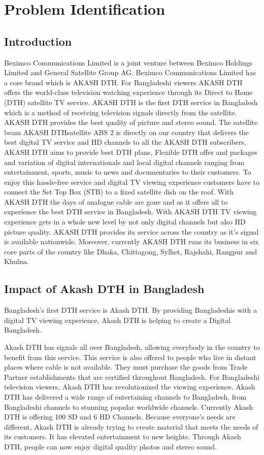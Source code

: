 \chapter{Problem Identification}
\begin{spacing}{1.0}
\setlength{\parskip}{0.3in}
\graphicspath{{./Chapter1/}}


\section{Introduction}
Beximco  Communications Limited is a joint venture between Beximco Holdings Limited and General Satellite Group AG. Beximco Communications Limited has a core brand which is AKASH DTH. For Bangladeshi viewers AKASH DTH offers the world-class television watching experience through its Direct to Home (DTH) satellite TV service. AKASH DTH is the first DTH service in Bangladesh which is a method of receiving television signals directly from the satellite. AKASH DTH provides the best quality of picture and stereo sound. The satellite beam AKASH DTHsatellite ABS 2 is directly on our country that delivers the best digital TV service and HD channels to all the AKASH DTH subscribers. AKASH DTH aims to provide best DTH plans, Flexible DTH offer and packages and variation of digital internationals and local digital channels ranging from entertainment, sports, music to news and documentaries to their customers. To enjoy this hassle-free service and digital TV viewing experience customers have to connect the Set Top Box (STB) to a fixed satellite dish on the roof. With AKASH DTH the days of analogue cable are gone and as it offers all to experience the best DTH service in Bangladesh. With AKASH DTH TV viewing experience gets in a whole new level by not only digital channels but also HD picture quality. AKASH DTH provides its service across the country as it’s signal is available nationwide. Moreover, currently AKASH DTH runs its business in six core parts of the country like Dhaka, Chittagong, Sylhet, Rajshahi, Rangpur and Khulna.

\section{Impact of Akash DTH in Bangladesh}
Bangladesh's first DTH service is Akash DTH. By providing Bangladeshis with a digital TV viewing experience, Akash DTH is helping to create a Digital Bangladesh.

Akash DTH has signals all over Bangladesh, allowing everybody in the country to benefit from this service. This service is also offered to people who live in distant places where cable is not available. They must purchase the goods from Trade Partner establishments that are certified throughout Bangladesh.
For Bangladeshi television viewers, Akash DTH has revolutionized the viewing experience. Akash DTH has delivered a wide range of entertaining channels to Bangladesh, from Bangladeshi channels to stunning popular worldwide channels. Currently Akash DTH is offering 100 SD and 6 HD Channels.
Because everyone's needs are different, Akash DTH is already trying to create material that meets the needs of its customers. It has elevated entertainment to new heights. Through Akash DTH, people can now enjoy digital quality photos and stereo sound.

\end{spacing}

